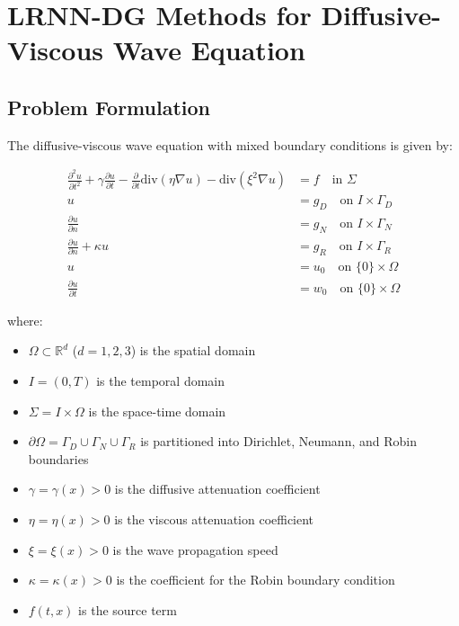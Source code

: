 \documentclass[11pt,a4paper]{article}
\begin{document}
\section{LRNN-DG Methods for Diffusive-Viscous Wave Equation}

\subsection{Problem Formulation}

The diffusive-viscous wave equation with mixed boundary conditions is given by:

\begin{align}
\frac{\partial^2 u}{\partial t^2} + \gamma \frac{\partial u}{\partial t} - \frac{\partial}{\partial t}\text{div}(\eta \nabla u) - \text{div}(\xi^2 \nabla u) &= f \quad \text{in } \Sigma \\
u &= g_D \quad \text{on } I \times \Gamma_D \\
\frac{\partial u}{\partial n} &= g_N \quad \text{on } I \times \Gamma_N \\
\frac{\partial u}{\partial n} + \kappa u &= g_R \quad \text{on } I \times \Gamma_R \\
u &= u_0 \quad \text{on } \{0\} \times \Omega \\
\frac{\partial u}{\partial t} &= w_0 \quad \text{on } \{0\} \times \Omega
\end{align}

where:
\begin{itemize}
    \item $\Omega \subset \mathbb{R}^d$ ($d = 1,2,3$) is the spatial domain
    \item $I = (0, T)$ is the temporal domain
    \item $\Sigma = I \times \Omega$ is the space-time domain
    \item $\partial\Omega = \Gamma_D \cup \Gamma_N \cup \Gamma_R$ is partitioned into Dirichlet, Neumann, and Robin boundaries
    \item $\gamma = \gamma(x) > 0$ is the diffusive attenuation coefficient
    \item $\eta = \eta(x) > 0$ is the viscous attenuation coefficient
    \item $\xi = \xi(x) > 0$ is the wave propagation speed
    \item $\kappa = \kappa(x) > 0$ is the coefficient for the Robin boundary condition
    \item $f(t,x)$ is the source term
\end{itemize}
\end{document}
